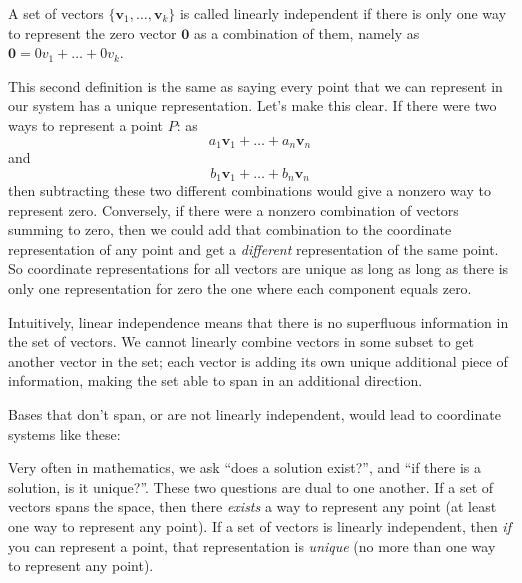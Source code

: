 \documentclass[../master.tex]{subfiles}
\begin{document}
	\begin{defn}
		A set of vectors $\{\mathbf v_1, \dots , \mathbf v_k \}$ is called linearly independent if there is only one way to represent the zero vector $\mathbf 0$ as a combination of them, namely as $\mathbf 0 = 0v_1 + \dots + 0 v_k$.
	\end{defn}
	
	This second definition is the same as saying every point that we can represent in our system has a unique representation. Let's make this clear. If there were two ways to represent a point $P$: as \begin{equation*}
		a_1 \mathbf v_1 + \dots + a_n \mathbf v_n
	\end{equation*} 
	and 
	\begin{equation*}
		b_1 \mathbf v_1 + \dots + b_n \mathbf v_n
	\end{equation*} 
	then subtracting these two different combinations would give a nonzero way to represent zero.  Conversely, if there were a nonzero combination of vectors summing to zero, then we could add that combination to the coordinate representation of any point and get a \emph{different} representation of the same point. So coordinate representations for all vectors are unique as long as long as there is only one representation for zero the one where each component equals zero.
	
	Intuitively, linear independence means that there is no superfluous information in the set of vectors.  We cannot linearly combine vectors in some subset to get another vector in the set; each vector is adding its own unique additional piece of information, making the set able to span in an additional direction.
	
	Bases that don't span, or are not linearly independent, would lead to coordinate systems like these:
	

	Very often in mathematics, we ask ``does a solution exist?'', and ``if there is a solution, is it unique?''. These two questions are dual to one another. If a set of vectors spans the space, then there \emph{exists} a way to represent any point (at least one way to represent any point). If a set of vectors is linearly independent, then \emph{if} you can represent a point, that representation is \emph{unique} (no more than one way to represent any point).
	
\end{document}
